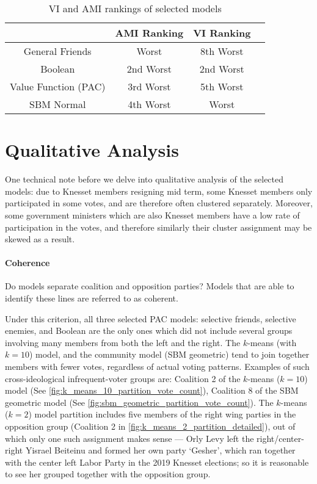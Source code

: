 \begin{table}[ht]
\centering
\begin{tabular}{|c|c|c|c|}
\hline
       & AMI Ranking & VI Ranking \\ \hline
General Friends & Worst & 8th Worst \\
Boolean & 2nd Worst & 2nd Worst \\
Value Function (PAC) & 3rd Worst & 5th Worst \\
SBM Normal & 4th Worst & Worst \\
\hline
\end{tabular}
\caption{VI and AMI rankings of selected models}
\label{Analysis:table:ami_vi_worst_rankings}
\end{table}


\section{Qualitative Analysis}
\label{sec:qualitative_analysis}

One technical note before we delve into qualitative analysis of the selected
models: due to Knesset members resigning mid term, some Knesset members only participated in some votes, and are therefore often clustered separately.
Moreover, some government ministers which are also Knesset members have a low
rate of participation in the votes, and therefore similarly their cluster
assignment may be skewed as a result.

\paragraph{Coherence}
Do models separate coalition and opposition parties? Models that are able to identify these lines are referred to as coherent.

Under this criterion, all three selected PAC models: selective friends,
selective enemies, and Boolean are the only ones which did not include several
groups involving many members from both the left and the right.
The $k$-means (with $k=10$) model, and the community model (SBM geometric) tend to
join together members with fewer votes, regardless of actual voting patterns.
Examples of such cross-ideological infrequent-voter groups are: Coalition 2
of the $k$-means ($k=10$) model (See \autoref{fig:k_means_10_partition_vote_count}),
Coalition 8 of the SBM geometric model (See
\autoref{fig:sbm_geometric_partition_vote_count}).
The $k$-means ($k=2$) model partition includes five members of the right wing
parties in the opposition group (Coalition 2 in
\autoref{fig:k_means_2_partition_detailed}), out of which only one such
assignment makes sense --- Orly Levy left the right/center-right Yisrael
Beiteinu and formed her own party `Gesher', which ran together with the center
left Labor Party in the 2019 Knesset elections\cite{knesset:levy, iki:levy};
so it is reasonable to see her grouped together with the opposition group.

